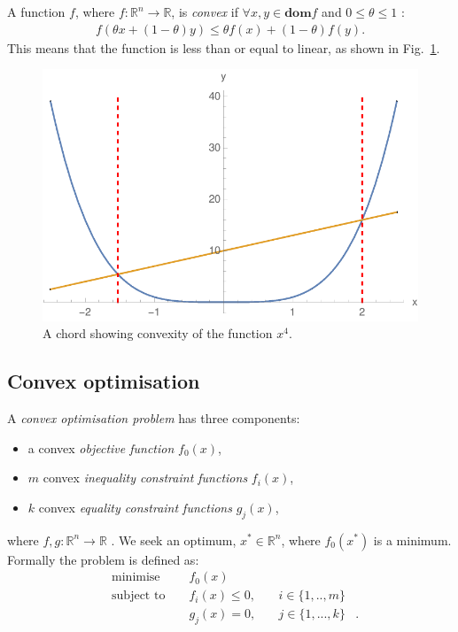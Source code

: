 \documentclass[twocolumn,secnumarabic,amssymb, nobibnotes, aps, prl,superscriptaddress]{revtex4-1}
\begin{document}
\noindent A function $f$, where $f:\mathbb{R}^n \rightarrow \mathbb{R}$, is \textit{convex} if $\forall x,y\in \textbf{dom} f$ and $0 \leq \theta \leq 1$ \cite[p.67]{cvxpybook}:
\begin{align}
f(\theta x + (1-\theta)y) \leq \theta f(x)+(1-\theta)f(y).
\end{align}
This means that the function is less than or equal to linear, as shown in Fig.~\ref{fig:convex}. %
\begin{figure}[h!]
\includegraphics[width=0.9\linewidth]{convex_function.pdf}
\caption{\label{fig:convex}A chord showing convexity of the function $x^4$.} 
\end{figure}

\subsection{Convex optimisation}
\noindent A \textit{convex optimisation problem} has three components:
\begin{itemize}
\item a convex \textit{objective function} $f_0(x)$,
\item $m$ convex \textit{inequality constraint functions} $f_i(x)$,
\item $k$ convex \textit{equality constraint functions} $g_j(x)$, 
\end{itemize}
where $f,g: \mathbb{R}^n \rightarrow \mathbb{R}$ \cite[p.141]{cvxpybook}. We seek an optimum, $x^*\in \mathbb{R}^n$, where $f_0(x^*)$ is a minimum. Formally the problem is defined as:
\begin{align} \label{eq:cvxdefn}
&\text{minimise } && f_0(x) & \nonumber &\\
&\text{subject to } && f_i(x) \leq 0,\quad & i\in \{1,..,m\}\nonumber &\\
& && g_{j}(x)=0,\quad & j\in \{1,...,k\} &.
\end{align}
\end{document}
